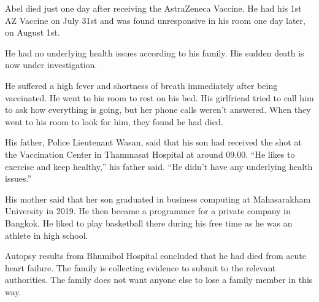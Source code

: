 Abel died just one day after receiving the AstraZeneca Vaccine. He had his 1st
AZ Vaccine on July 31st and was found unresponsive in his room one day later, on
August 1st.

He had no underlying health issues according to his family. His sudden death is
now under investigation.

He suffered a high fever and shortness of breath immediately after being
vaccinated. He went to his room to rest on his bed. His girlfriend tried to call
him to ask how everything is going, but her phone calls weren’t answered. When
they went to his room to look for him, they found he had died.

His father, Police Lieutenant Wasan, said that his son had received the shot at
the Vaccination Center in Thammasat Hospital at around 09.00. “He likes to
exercise and keep healthy,” his father said. “He didn’t have any underlying
health issues.”

His mother said that her son graduated in business computing at Mahasarakham
University in 2019. He then became a programmer for a private company in
Bangkok. He liked to play basketball there during his free time as he was an
athlete in high school.

Autopsy results from Bhumibol Hospital concluded that he had died from acute
heart failure. The family is collecting evidence to submit to the relevant
authorities. The family does not want anyone else to lose a family member in
this way.

